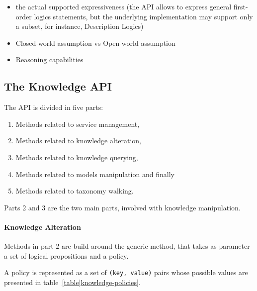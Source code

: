 \begin{itemize}
    \item  the actual supported expressiveness (the API allows to express
    general first-order logics statements, but the underlying implementation
    may support only a subset, for instance, Description Logics)
    \item  Closed-world assumption vs Open-world assumption
    \item  Reasoning capabilities
\end{itemize}

\subsection{The Knowledge API}

The API is divided in five parts:
\begin{enumerate}
    \item Methods related to service management,
    \item Methods related to knowledge alteration,
    \item Methods related to knowledge querying,
    \item Methods related to models manipulation and finally
    \item Methods related to taxonomy walking.
\end{enumerate}

Parts 2 and 3 are the two main parts, involved with knowledge manipulation.

\paragraph{Knowledge Alteration} Methods in part 2 are build around the generic
 method, that takes as parameter a set of logical propositions
and a policy.

A policy is represented as a set of \texttt{(key, value)} pairs whose possible
values are presented in table~\ref{table|knowledge-policies}.

